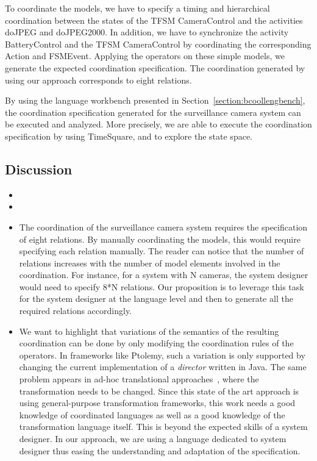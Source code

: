 To coordinate the models, we have to specify a timing and hierarchical coordination between the states of the TFSM CameraControl and the activities doJPEG and doJPEG2000. In addition, we have to synchronize the activity BatteryControl and the TFSM CameraControl by coordinating the corresponding Action and FSMEvent. Applying the operators on these simple models, we generate the expected coordination specification. The coordination generated by using our approach corresponds to eight \ccsl relations.
	
By using the language workbench presented in Section~\ref{section:bcoollengbench}, the coordination specification generated for the surveillance camera system can be executed and analyzed. More precisely, we are able to execute the coordination specification by using TimeSquare, and to explore the state space. 


\subsection{Discussion}
	
\begin{itemize}
	\item {}
	\item {}
	\item The coordination of the surveillance camera system requires the specification of eight \ccsl relations. By manually coordinating the models, this would require specifying each relation manually. The reader can notice that the number of relations increases with the number of model elements involved in the coordination. For instance, for a system with N cameras, the system designer would need to specify 8*N relations. Our proposition is to leverage this task for the system designer at the language level and then to generate all the required relations accordingly.
	
	\item We want to highlight that variations of the semantics of the resulting coordination can be done by only modifying the coordination rules of the operators. In frameworks like Ptolemy, such a variation is only supported by changing the current implementation of a \emph{director} written in Java. The same problem appears in ad-hoc translational approaches~\cite{MarcoModels2014}, where the transformation needs to be changed. Since this state of the art approach is using general-purpose transformation frameworks, this work needs a good knowledge of coordinated languages as well as a good knowledge of the transformation language itself. This is beyond the expected skills of a system designer. In our approach, we are using a language dedicated to system designer thus easing the understanding and adaptation of the \bcool specification.
\end{itemize}